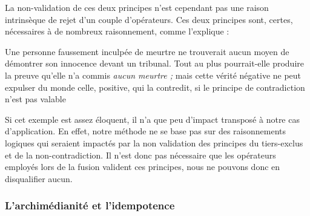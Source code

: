 La non-validation de ces deux principes n'est cependant pas une raison
intrinsèque de rejet d'un couple d'opérateurs. Ces deux principes
sont, certes, nécessaires à de nombreux raisonnement, comme
l'explique \textcite{Lukasiewicz1910} :

\begin{displayquote}
   Une personne
  faussement inculpée de meurtre ne trouverait aucun moyen de
  démontrer son innocence devant un tribunal. Tout au plus
  pourrait-elle produire la preuve qu'elle n'a commis \emph{aucun
    meurtre ;} mais cette vérité négative ne peut expulser du monde
  celle, positive, qui la contredit, si le principe de contradiction
  n'est pas valable
\end{displayquote}

Si cet exemple est assez éloquent, il n'a que peu d'impact transposé à
notre cas d’application. En effet, notre méthode ne se base pas sur
des raisonnements logiques qui seraient impactés par la non validation
des principes du tiers-exclus et de la non-contradiction. Il n'est
donc pas nécessaire que les opérateurs employés lors de la fusion
valident ces principes, nous ne pouvons donc en disqualifier aucun.


\subsubsection{L'archimédianité et l’idempotence}

